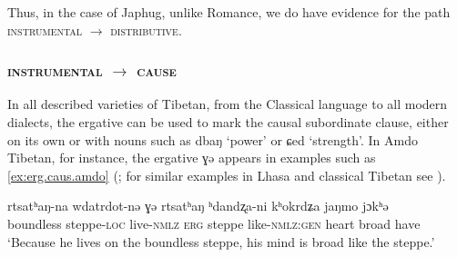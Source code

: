 \documentclass[oldfontcommands,oneside,a4paper,11pt]{article}
\newcommand{\ipa}[1]{{\phon #1}} %
\begin{document}
Thus, in the case of Japhug, unlike Romance, we do have evidence for the path \textsc{instrumental} $\rightarrow$ \textsc{distributive}.
  

% 
 

 \subsubsection{\textsc{instrumental} $\rightarrow$ \textsc{cause}} \label{sec:instr2cause}

In all described varieties of Tibetan, from the Classical language to all modern dialects, the ergative can be used to mark the causal subordinate clause, either on its own or with nouns such as \ipa{dbaŋ} `power' or \ipa{ɕed} `strength'. In Amdo Tibetan, for instance, the ergative \ipa{ɣə} appears in examples such as \ref{ex:erg.caus.amdo} (\citealt[271-272]{vbrugmo03maqu}; for similar examples in Lhasa and classical Tibetan see \citealt[129]{tournadre96erg}).
 \begin{exe} 
\ex \label{ex:erg.caus.amdo}
\gll  \ipa{kʰokjaŋwi} 	\ipa{rtsatʰaŋ-na} 	\ipa{wdatrdot-nə} 	\ipa{ɣə} 	\ipa{rtsatʰaŋ} 	\ipa{ʰdandʐa-ni} 	\ipa{kʰokrdʑa} 	\ipa{jaŋmo} 	\ipa{jɔkʰə}  \\
boundless steppe-\textsc{loc} live-\textsc{nmlz} \textsc{erg} steppe like-\textsc{nmlz:gen} heart broad have \\
\glt  `Because he lives on the boundless steppe, his mind is broad like the steppe.'
\end{exe}  
 
\end{document}
